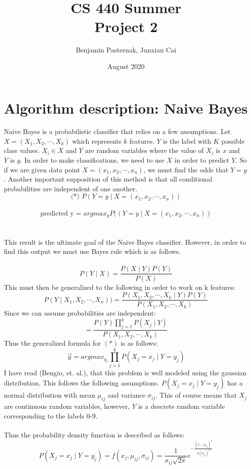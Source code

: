 \documentclass{article}
\title{CS 440 Summer \\ Project 2}
\author{Benjamin Pasternak, Junxian Cai}
\date{August 2020}
\begin{document}
\maketitle

\section*{Algorithm description: Naive Bayes}
\paragraph*{}
Naive Bayes is a probabilistic classifier that relies on a few assumptions. Let $X = (X_1,X_2,\cdots , X_k)$ which represents $k$ features. $Y$ is the label with $K$ possible class values. $X_i \in X$ and $Y$ are random variables where the value of $X_i$ is $x$ and $Y\text{ is } y$. In order to make classifications, we need to use $X$ in order to predict $Y$. So if we are given data point $X = (x_1,x_2,\cdots ,x_n)$, we must find the odds that $Y=y$. Another important supposition of this method is that all conditional probabilities are independent of one another.\\

$$\text{(*) }P(Y=y\mid X = (x_1,x_2,\cdots ,x_n))$$\\
$$\text{predicted y = } argmax_yP((Y=y\mid X = (x_1,x_2,\cdots ,x_n))$$\\
\\
This result is the ultimate goal of the Naive Bayes classifier. However, in order to find this output we must use Bayes rule which is as follows. \\
\\
$$P(Y\mid X)=\frac{P(X\mid Y)P(Y)}{P(X)}$$
This must then be generalized to the following in order to work on k features:\\
$$P(Y\mid X_1,X_2,\cdots ,X_n)) = \frac{P(X_1,X_2,\cdots ,X_k\mid Y)P(Y)}{P(X_1,X_2,\cdots ,X_k)}$$
Since we can assume probabilities are independent:
$$= \frac{P(Y)\prod_{j=1}^{k} P(X_j\mid Y)}{P(X_1,X_2,\cdots ,X_k)}$$
Thus the generalized formula for $(*)$ is as follows:
$$\Vec{y} = argmax_{y_i}\prod_{j=1}^{k} P(X_j = x_j\mid Y = y_j)$$
I have read (Bengio, et. al.), that this problem is well modeled using the gaussian distribution. This follows the following assumptions. $P(X_j = x_j\mid Y = y_j)$ has a normal distribution with mean $\mu_{ij}$ and variance $\sigma_{ij}$. This of course means that $X_j$ are continuous random variables, however, $Y$ is a descrete random variable corresponding to the labels 0-9.\\
\\
Thus the probability density function is described as follows: $$P(X_j = x_j\mid Y = y_j) = f(x_j,\mu_{ij},\sigma_{ij}) = \frac{1}{\sigma_{ij}\sqrt{2\pi}}e^{-\frac{(x-\mu_{ij})^2}{2(\sigma_{ij})^2}}$$
\end{document}
